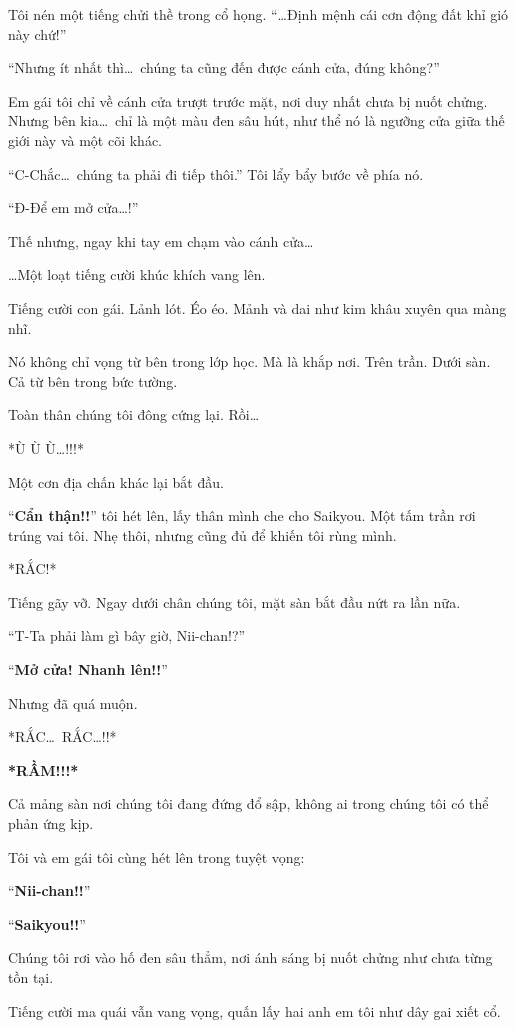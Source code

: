 \documentclass[../main.tex]{subfiles}
\begin{document}
Tôi nén một tiếng chửi thề trong cổ họng. ``\dots Định mệnh cái cơn động đất khỉ gió này chứ!''

``Nhưng ít nhất thì\dots\ chúng ta cũng đến được cánh cửa, đúng không?''

Em gái tôi chỉ về cánh cửa trượt trước mặt, nơi duy nhất chưa bị nuốt chửng. Nhưng bên kia\dots\ chỉ là một màu đen sâu hút, như thể nó là ngưỡng cửa giữa thế giới này và một cõi khác.

``C-Chắc\dots\ chúng ta phải đi tiếp thôi.'' Tôi lẩy bẩy bước về phía nó.

``Đ-Để em mở cửa\dots!''

Thế nhưng, ngay khi tay em chạm vào cánh cửa\dots

\dots Một loạt tiếng cười khúc khích vang lên.

Tiếng cười con gái. Lảnh lót. Éo éo. Mảnh và dai như kim khâu xuyên qua màng nhĩ.

Nó không chỉ vọng từ bên trong lớp học. Mà là khắp nơi. Trên trần. Dưới sàn. Cả từ bên trong bức tường.

Toàn thân chúng tôi đông cứng lại. Rồi\dots

*Ù Ù Ù\dots!!!*

Một cơn địa chấn khác lại bắt đầu.

``\textbf{Cẩn thận!!}'' tôi hét lên, lấy thân mình che cho Saikyou. Một tấm trần rơi trúng vai tôi. Nhẹ thôi, nhưng cũng đủ để khiến tôi rùng mình.

*RẮC!*

Tiếng gãy vỡ. Ngay dưới chân chúng tôi, mặt sàn bắt đầu nứt ra lần nữa.

``T-Ta phải làm gì bây giờ, Nii-chan!?''

``\textbf{Mở cửa! Nhanh lên!!}''

Nhưng đã quá muộn.

*RẮC\dots\ RẮC\dots!!*

\textbf{*RẦM!!!*}

Cả mảng sàn nơi chúng tôi đang đứng đổ sập, không ai trong chúng tôi có thể phản ứng kịp.

Tôi và em gái tôi cùng hét lên trong tuyệt vọng:

``\textbf{Nii-chan!!}''

``\textbf{Saikyou!!}''

Chúng tôi rơi vào hố đen sâu thẳm, nơi ánh sáng bị nuốt chửng như chưa từng tồn tại.

Tiếng cười ma quái vẫn vang vọng, quấn lấy hai anh em tôi như dây gai xiết cổ.
\end{document}

